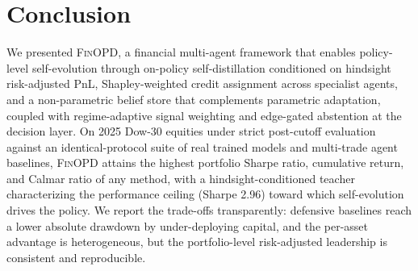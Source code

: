 \section{Conclusion}
\label{sec:conclusion}

We presented \textsc{FinOPD}, a financial multi-agent framework that enables policy-level self-evolution through on-policy self-distillation conditioned on hindsight risk-adjusted PnL, Shapley-weighted credit assignment across specialist agents, and a non-parametric belief store that complements parametric adaptation, coupled with regime-adaptive signal weighting and edge-gated abstention at the decision layer. On 2025 Dow-30 equities under strict post-cutoff evaluation against an identical-protocol suite of real trained models and multi-trade agent baselines, \textsc{FinOPD} attains the highest portfolio Sharpe ratio, cumulative return, and Calmar ratio of any method, with a hindsight-conditioned teacher characterizing the performance ceiling (Sharpe 2.96) toward which self-evolution drives the policy. We report the trade-offs transparently: defensive baselines reach a lower absolute drawdown by under-deploying capital, and the per-asset advantage is heterogeneous, but the portfolio-level risk-adjusted leadership is consistent and reproducible.
